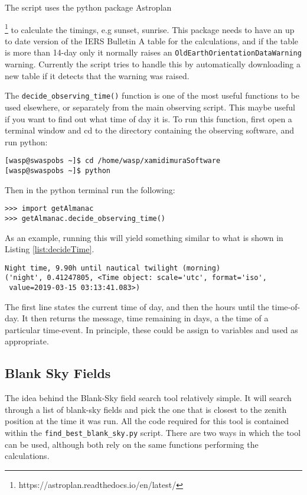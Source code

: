 \documentclass[a4paper,12pt]{article}
\begin{document}
The script uses the python package Astroplan{\footnote{https://astroplan.readthedocs.io/en/latest/} to calculate the timings, e.g sunset, sunrise. This package needs to have an up to date version of the IERS Bulletin A table for the calculations, and if the table is more than 14-day only it normally raises an {\tt OldEarthOrientationDataWarning} warning. Currently the script tries to handle this by automatically downloading a new table if it detects that the warning was raised.

The {\tt decide\_observing\_time()} function is one of the most useful functions to be used elsewhere, or separately from the main observing script. This maybe useful if you want to find out what time of day it is. To run this function, first open a terminal window and cd to the directory containing the observing software, and run python:
\begin{verbatim}
[wasp@swaspobs ~]$ cd /home/wasp/xamidimuraSoftware
[wasp@swaspobs ~]$ python
\end{verbatim}
Then in the python terminal run the following:
\begin{verbatim}
>>> import getAlmanac
>>> getAlmanac.decide_observing_time()
\end{verbatim}
As an example, running this will yield something similar to what is shown in Listing \ref{list:decideTime}.
\begin{lstlisting}[caption={Output from the {\tt decide\_observing\_time} python function}, label={list:decideTime}]
Night time, 9.90h until nautical twilight (morning)
('night', 0.41247805, <Time object: scale='utc', format='iso', 
 value=2019-03-15 03:13:41.083>)
 \end{lstlisting}
The first line states the current time of day, and then the hours until the time-of-day. It then returns the message, time remaining in days, a the time of a particular time-event. In principle, these could be assign to variables and used as appropriate.

\subsection{Blank Sky Fields}
\label{subsec:blanksky}

The idea behind the Blank-Sky field search tool relatively simple. It will search through a list of blank-sky fields and pick the one that is closest to the zenith position at the time it was run. All the code required for this tool is contained within the {\tt find\_best\_blank\_sky.py} script. There are two ways in which the tool can be used, although both rely on the same functions performing the calculations.

}
\end{document}
